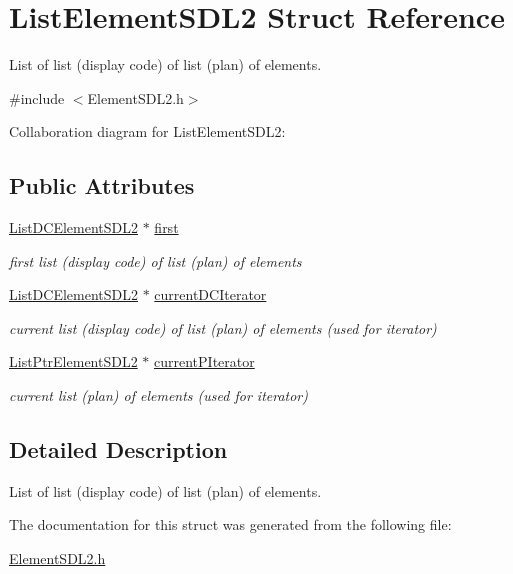 \hypertarget{structListElementSDL2}{}\section{List\+Element\+S\+D\+L2 Struct Reference}
\label{structListElementSDL2}


List of list (display code) of list (plan) of elements.  




{\ttfamily \#include $<$Element\+S\+D\+L2.\+h$>$}



Collaboration diagram for List\+Element\+S\+D\+L2\+:
\subsection*{Public Attributes}
\begin{DoxyCompactItemize}
\item 
\hyperlink{structListDCElementSDL2}{List\+D\+C\+Element\+S\+D\+L2} $\ast$ \hyperlink{structListElementSDL2_a7f871d1b4f017fc8c778c49a3583eecb}{first}\hypertarget{structListElementSDL2_a7f871d1b4f017fc8c778c49a3583eecb}{}\label{structListElementSDL2_a7f871d1b4f017fc8c778c49a3583eecb}

\begin{DoxyCompactList}\small\item\em first list (display code) of list (plan) of elements \end{DoxyCompactList}\item 
\hyperlink{structListDCElementSDL2}{List\+D\+C\+Element\+S\+D\+L2} $\ast$ \hyperlink{structListElementSDL2_aa2c7b7135bd405aeed7860875569c7dd}{current\+D\+C\+Iterator}\hypertarget{structListElementSDL2_aa2c7b7135bd405aeed7860875569c7dd}{}\label{structListElementSDL2_aa2c7b7135bd405aeed7860875569c7dd}

\begin{DoxyCompactList}\small\item\em current list (display code) of list (plan) of elements (used for iterator) \end{DoxyCompactList}\item 
\hyperlink{structListPtrElementSDL2}{List\+Ptr\+Element\+S\+D\+L2} $\ast$ \hyperlink{structListElementSDL2_a3bb9a3656cbff63c06e54554f93b2f87}{current\+P\+Iterator}\hypertarget{structListElementSDL2_a3bb9a3656cbff63c06e54554f93b2f87}{}\label{structListElementSDL2_a3bb9a3656cbff63c06e54554f93b2f87}

\begin{DoxyCompactList}\small\item\em current list (plan) of elements (used for iterator) \end{DoxyCompactList}\end{DoxyCompactItemize}


\subsection{Detailed Description}
List of list (display code) of list (plan) of elements. 

The documentation for this struct was generated from the following file\+:\begin{DoxyCompactItemize}
\item 
\hyperlink{ElementSDL2_8h}{Element\+S\+D\+L2.\+h}\end{DoxyCompactItemize}
